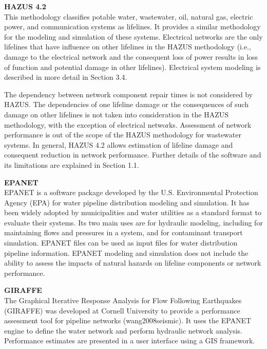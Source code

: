 \noindent\textbf{HAZUS 4.2} \\This methodology classifies potable water, wastewater, oil, natural gas, electric power, and communication systems as lifelines. It provides a similar methodology for the modeling and simulation of these systems. Electrical networks are the only lifelines that have influence on other lifelines in the HAZUS methodology (i.e., damage to the electrical network and the consequent loss of power results in loss of function and potential damage in other lifelines). Electrical system modeling is described in more detail in Section 3.4.

The dependency between network component repair times is not considered by HAZUS. The dependencies of one lifeline damage or the consequences of such damage on other lifelines is not taken into consideration in the HAZUS methodology, with the exception of electrical networks. Assessment of network performance is out of the scope of the HAZUS methodology for wastewater systems. In general, HAZUS 4.2 allows estimation of lifeline damage and consequent reduction in network performance. Further details of the software and its limitations are explained in Section 1.1.
\newline

\noindent\textbf{EPANET} \\EPANET is a software package developed by the U.S. Environmental Protection Agency (EPA) for water pipeline distribution modeling and simulation. It has been widely adopted by municipalities and water utilities as a standard format to evaluate their systems. Its two main uses are for hydraulic modeling, including for maintaining flows and pressures in a system, and for contaminant transport simulation. EPANET files can be used as input files for water distribution pipeline information. EPANET modeling and simulation does not include the ability to assess the impacts of natural hazards on lifeline components or network performance.
\newline

\noindent\textbf{GIRAFFE} \\The Graphical Iterative Response Analysis for Flow Following Earthquakes (GIRAFFE) was developed at Cornell University to provide a performance assessment tool for pipeline networks (wang2008seismic). It uses the EPANET engine to define the water network and perform hydraulic network analysis. Performance estimates are presented in a user interface using a GIS framework.
\newline

